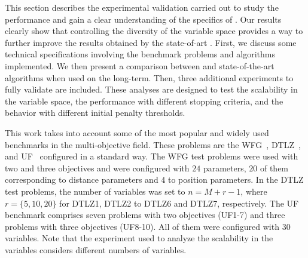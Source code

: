 This section describes the experimental validation carried out to study the performance and
gain a clear understanding of the specifics of \VSDMOEA{}.
%
Our results clearly show that controlling the diversity of the variable space provides a way to further improve the results
obtained by the state-of-art \MOEAS{}.
%
First, we discuss some technical specifications involving the benchmark problems and algorithms implemented.
%
We then present a comparison between \VSDMOEA{} and state-of-the-art algorithms when used on the long-term.
%
Then, three additional experiments to fully validate \VSDMOEA{} are included.
%
These analyses are designed to test the scalability in the variable space, the performance with different stopping criteria,
and the behavior with different initial penalty thresholds.

This work takes into account some of the most popular and widely used benchmarks in the multi-objective field.
%
These problems are the WFG~\cite{Joel:WFG}, DTLZ~\cite{Joel:DTLZ}, and UF~\cite{Joel:CEC2009} configured in a
standard way.
%
The WFG test problems were used with two and three objectives and
were configured with $24$ parameters, $20$ of them corresponding to distance parameters and $4$ to position parameters.
%
In the DTLZ test problems, the number of variables was set to $n=M+r-1$, where $r=\{5, 10, 20\}$ for DTLZ1, DTLZ2 to DTLZ6 and DTLZ7, respectively.
% 
The UF benchmark comprises seven problems with two objectives (UF1-7) and three problems with three objectives (UF8-10).
%
All of them were configured with $30$ variables.
%
Note that the experiment used to analyze the scalability in the variables considers different numbers of variables.

